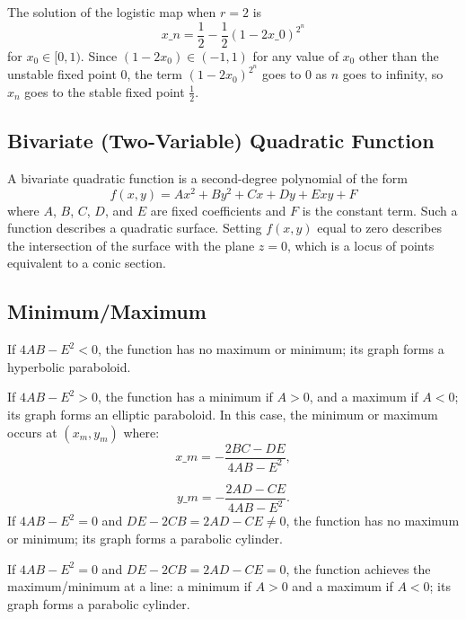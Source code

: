 The solution of the logistic map when $r = 2$ is
\[
x\_n = \frac{1}{2} - \frac{1}{2} (1 - 2x\_0)^{2^n}
\]
for $x_0 \in [0, 1)$. Since $(1 - 2x_0) \in (-1, 1)$ for any value of $x_0$ other than the unstable fixed point 0, the term $(1 - 2x_0)^{2^n}$ goes to 0 as $n$ goes to infinity, so $x_n$ goes to the stable fixed point $\frac{1}{2}$.

\subsection{Bivariate (Two-Variable) Quadratic Function}
\label{sss:biva-483b}

A bivariate quadratic function is a second-degree polynomial of the form
\[
f(x, y) = Ax^2 + By^2 + Cx + Dy + Exy + F
\]
where $A$, $B$, $C$, $D$, and $E$ are fixed coefficients and $F$ is the constant term. Such a function describes a quadratic surface. Setting $f(x, y)$ equal to zero describes the intersection of the surface with the plane $z = 0$, which is a locus of points equivalent to a conic section.

\subsection{Minimum/Maximum}
\label{sss:mini-36e1}

If $4AB - E^2 < 0$, the function has no maximum or minimum; its graph forms a hyperbolic paraboloid.

If $4AB - E^2 > 0$, the function has a minimum if $A > 0$, and a maximum if $A < 0$; its graph forms an elliptic paraboloid. In this case, the minimum or maximum occurs at $(x_m, y_m)$ where:
\[
x\_m = -\frac{2BC - DE}{4AB - E^2},
\]

\[
y\_m = -\frac{2AD - CE}{4AB - E^2}.
\]
If $4AB - E^2 = 0$ and $DE - 2CB = 2AD - CE \neq 0$, the function has no maximum or minimum; its graph forms a parabolic cylinder.

If $4AB - E^2 = 0$ and $DE - 2CB = 2AD - CE = 0$, the function achieves the maximum/minimum at a line: a minimum if $A > 0$ and a maximum if $A < 0$; its graph forms a parabolic cylinder.

